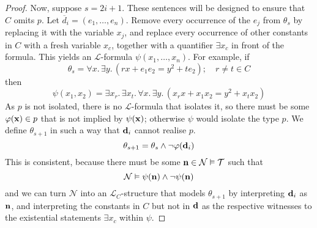 \begin{proof}
    Now, suppose \( s = 2i + 1 \).
    These sentences will be designed to ensure that \( C \) omits \( p \).
    Let \( \overline d_i = (e_1, \dots, e_n) \).
    Remove every occurrence of the \( e_j \) from \( \theta_s \) by replacing it with the variable \( x_j \), and replace every occurrence of other constants in \( C \) with a fresh variable \( x_c \), together with a quantifier \( \exists x_c \) in front of the formula.
    This yields an \( \mathcal L \)-formula \( \psi(x_1, \dots, x_n) \).
    For example, if
    \[ \theta_s = \forall x.\, \exists y.\, (rx + e_1 e_2 = y^2 + t e_2);\quad r \neq t \in C \]
    then
    \[ \psi(x_1, x_2) = \exists x_r.\, \exists x_t.\, \forall x.\, \exists y.\, (x_r x + x_1 x_2 = y^2 + x_t x_2) \]
    As \( p \) is not isolated, there is no \( \mathcal L \)-formula that isolates it, so there must be some \( \varphi(\vb x) \in p \) that is not implied by \( \psi(\vb x) \); otherwise \( \psi \) would isolate the type \( p \).
    We define \( \theta_{s+1} \) in such a way that \( \vb d_i \) cannot realise \( p \).
    \[ \theta_{s + 1} = \theta_s \wedge \neg \varphi(\vb d_i) \]
    This is consistent, because there must be some \( \vb n \in \mathcal N \vDash \mathcal T \) such that
    \[ \mathcal N \vDash \psi(\vb n) \wedge \neg \psi(\vb n) \]
    and we can turn \( \mathcal N \) into an \( \mathcal L_C \)-structure that models \( \theta_{s+1} \) by interpreting \( \vb d_i \) as \( \vb n \), and interpreting the constants in \( C \) but not in \( \vb d \) as the respective witnesses to the existential statements \( \exists x_c \) within \( \psi \).
\end{proof}
